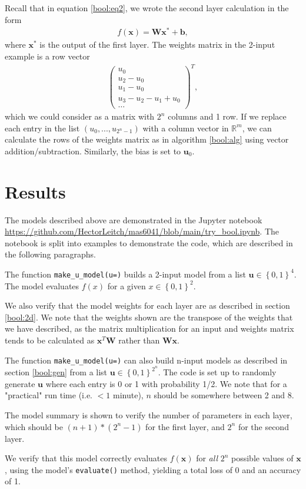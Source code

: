 \documentclass{somasmsc}
\begin{document}
Recall that in equation \ref{bool:eq2}, we wrote the second layer calculation in the form
\begin{align*}
    f(\pmb{x}) = \mathbf{W}\pmb{x}^* + \pmb{b},
\end{align*}
where $\pmb{x}^*$ is the output of the first layer. The weights matrix in the 2-input example is a row vector
\begin{align*}
\begin{pmatrix}
    u_0 \\
    u_2 - u_0 \\
    u_1 - u_0 \\
    u_3 - u_2 - u_1 + u_0 \\
    \dots
\end{pmatrix}^T,
\end{align*}
which we could consider as a matrix with $2^n$ columns and 1 row. If we replace each entry in the list $\left(u_0, ..., u_{2^n-1}\right)$ with a column vector in $\mathbb{R}^m$, we can calculate the rows of the weights matrix as in algorithm \ref{bool:alg} using vector addition/subtraction. Similarly, the bias is set to $\pmb{u}_0$.

\section{Results}

The models described above are demonstrated in the Jupyter notebook \url{https://github.com/HectorLeitch/mas6041/blob/main/try_bool.ipynb}. The notebook is split into examples to demonstrate the code, which are described in the following paragraphs.

\begin{exa}
The function \verb|make_u_model(u=)| builds a 2-input model from a list $\pmb{u} \in \left\{0, 1\right\}^4$. The model evaluates $f(x)$ for a given $x \in \left\{0, 1\right\}^2$.

We also verify that the model weights for each layer are as described in section \ref{bool:2d}. We note that the weights shown are the transpose of the weights that we have described, as the matrix multiplication for an input and weights matrix tends to be calculated as $\pmb{x}^T\mathbf{W}$ rather than $\mathbf{W}\pmb{x}$.
\end{exa}

\begin{exa}
The function \verb|make_u_model(u=)| can also build n-input models as described in section \ref{bool:gen} from a list $\pmb{u} \in \left\{0, 1\right\}^{2^n}$. The code is set up to randomly generate $\pmb{u}$ where each entry is 0 or 1 with probability 1/2. We note that for a "practical" run time (i.e. $<1$ minute), $n$ should be somewhere between 2 and 8.

The model summary is shown to verify the number of parameters in each layer, which should be $\left(n+1\right)*\left(2^n-1\right)$ for the first layer, and $2^n$ for the second layer.

We verify that this model correctly evaluates $f(\pmb{x})$ for \textit{all} $2^n$ possible values of $\pmb{x}$, using the model's \verb|evaluate()| method, yielding a total loss of 0 and an accuracy of 1.
\end{exa}
\end{document}
